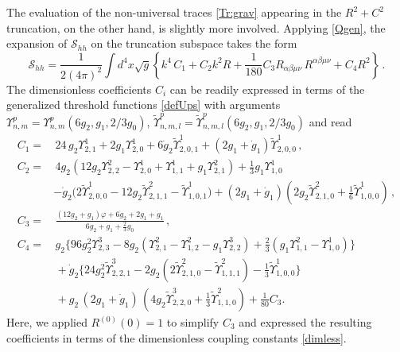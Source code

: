 \documentclass[preprint,preprintnumbers,amsmath,amssymb,nofootinbib,APS]{revtex4}
\newcommand{\be}{\begin{equation}}
\newcommand{\ee}{\end{equation}}
\newcommand{\cS}{\mathcal{S}}
\newcommand{\2}{\sqrt{2\,}}
\newcommand{\dg}{{\dot{g}}}
\newcommand{\tU}{{\tilde{\Upsilon}}}
\newcommand{\U}{\Upsilon}
\begin{document}
\begin{appendix}
The evaluation of the non-universal traces \eqref{Tr:grav} appearing in the $R^2+C^2$ truncation,  on the other hand, is slightly more involved.
Applying \eqref{Qgen}, 
the expansion of $\cS_{hh}$ on the truncation subspace takes the form
%
\be\label{eq:TRh}
\cS_{hh} = \frac{1}{2(4\pi)^2} \int d^4x \sqrt{g}
\left\{ k^4 \, C_1 + C_2 k^2 R + \frac{1}{180} C_3 R_{\alpha \beta\mu\nu} \, R^{\alpha \beta\mu\nu} + C_4 R^2 \right\} \, .
\ee
%
The dimensionless coefficients $C_i$ can be readily expressed in terms of the generalized threshold functions \eqref{defUps} with arguments $\U^p_{n,m} = \U^p_{n,m}(6g_2,g_1, 2/3 g_0)$, $\tU^p_{n,m,l} = \tU^p_{n,m,l}(6g_2,g_1, 2/3 g_0)$ and read
%
\be\label{Ccoeff}
\begin{split}
C_1 = & \,  24 \, g_2 \Upsilon^1_{2,1} + 2 g_1 \U^1_{2,0}
+ 6 \dg_2 \tU^1_{2,0,1} + (2 g_1 + \dg_1) \tU^1_{2,0,0} \, , \\
%
C_2 = & \, 4 g_2 \left( 12 g_2 \U^2_{2,2} - \U^1_{2,0} + \U^1_{1,1} + g_1 \U^2_{2,1} \right)  + \tfrac{1}{3} g_1 \U^1_{1,0} \\ &
- \dg_2 \big( 2 \tU^1_{2,0,0} - 12 g_2 \tU^2_{2,1,1} - \tU^1_{1,0,1} \big) 
+ (2 g_1 + \dg_1) (2 g_2 \tU^2_{2,1,0} + \tfrac{1}{6} \tU^1_{1,0,0}) \, , \\
%
C_3 = & \, \frac{(12 g_2 + g_1) \varphi + 6 \dg_2 + 2 g_1 + \dg_1}{6 g_2 + g_1 + \tfrac{2}{3} g_0} \, , \\
%
C_4 = & \,   g_2 \big\{ 96 g_2^2 \U^3_{2,3} - 8 g_2 ( \U^2_{2,1} - \U^2_{1,2} - g_1 \U^3_{2,2} ) + \tfrac{2}{3} (g_1 \U^2_{1,1} - \U^1_{1,0} ) \big\} \\
& \, + \dg_2 \big\{ 24 g_2^2 \tU^3_{2,2,1} - 2 g_2 ( 2 \tU^2_{2,1,0} - \tU^2_{1,1,1}) - \tfrac{1}{3} \tU^1_{1,0,0} \big\} \\& \,
 + g_2 \, (2 g_1 + \dg_1) \, (4 g_2 \tU^3_{2,2,0} + \tfrac{1}{3} \tU^2_{1,1,0} ) + \tfrac{1}{80} C_3 .
\end{split}
\ee
%
Here, we applied $R^{(0)}(0) = 1$ to simplify $C_3$ and expressed the resulting coefficients
in terms of the dimensionless coupling constants \eqref{dimless}.


\end{appendix}
\end{document}
